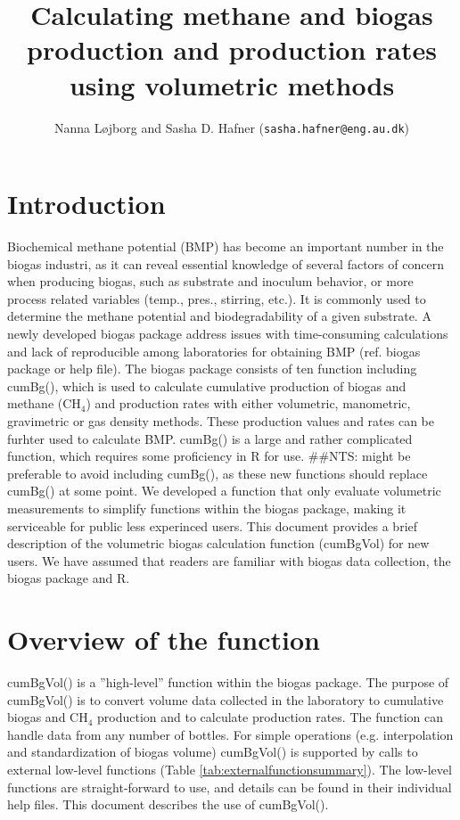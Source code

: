 \documentclass{article}
\title{Calculating methane and biogas production and production rates using volumetric  methods}
\author{Nanna Løjborg and Sasha D. Hafner (\texttt{sasha.hafner@eng.au.dk})}
\begin{document}


\maketitle

\section{Introduction}
Biochemical methane potential (BMP) has become an important number in the biogas industri, as it can reveal essential knowledge of several factors of concern when producing biogas, such as substrate and inoculum behavior, or more process related variables (temp., pres., stirring, etc.). It is commonly used to determine the methane potential and biodegradability of a given substrate. A newly developed biogas package address issues with time-consuming calculations and lack of reproducible among laboratories for obtaining BMP (ref. biogas package or help file). The biogas package consists of ten function including cumBg(), which is used to calculate cumulative production of biogas and methane (CH$_4$) and production rates with either volumetric, manometric, gravimetric or gas density methods. These production values and rates can be furhter used to calculate BMP. cumBg() is a large and rather complicated function, which requires some proficiency in R for use. ##NTS: might be preferable to avoid including cumBg(), as these new functions should replace cumBg() at some point. 
We developed a function that only evaluate volumetric measurements to simplify functions within the biogas package, making it serviceable for public less experinced users. 
This document provides a brief description of the volumetric biogas calculation function (cumBgVol) for new users.
We have assumed that readers are familiar with biogas data collection, the biogas package and R.

\section{Overview of the function}
cumBgVol() is a ''high-level'' function within the biogas package. The purpose of cumBgVol() is to convert volume data collected in the laboratory to cumulative biogas and CH$_4$ production and to calculate production rates. The function can handle data from any number of bottles. For simple operations (e.g. interpolation and standardization of biogas volume) cumBgVol() is supported by calls to external low-level functions (Table \ref{tab:externalfunctionsummary}). The low-level functions are straight-forward to use, and details can be found in their individual help files.
This document describes the use of cumBgVol(). 
\end{document}
